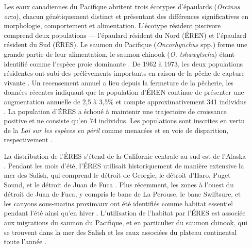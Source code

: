 Les eaux canadiennes du Pacifique abritent trois écotypes d'épaulards (\textit{Orcinus orca}), chacun génétiquement distinct et présentant des différences significatives en morphologie, comportement et alimentation. L'écotype résident piscivore comprend deux populations — l'épaulard résident du Nord (ÉREN) et l'épaulard résident du Sud (ÉRES). Le saumon du Pacifique (\textit{Oncorhynchus} spp.) forme une grande partie de leur alimentation, le saumon chinook (\textit{O. tshawytscha}) étant identifié comme l'espèce proie dominante \citep{fordSelectiveForagingFisheating2006, fordDietarySpecializationTwo1998, hansonSpeciesStockIdentification2010}. De 1962 à 1973, les deux populations résidentes ont subi des prélèvements importants en raison de la pêche de capture vivante \citep{biggLivecaptureKillerWhale1975}. Un recensement annuel a lieu depuis la fermeture de la pêcherie, les données récentes indiquant que la population d'ÉREN continue de présenter une augmentation annuelle de 2,5 à 3,5\% et compte approximativement 341 individus \citep{dfoPopulationStatusUpdate2023}. La population d'ÉRES a échoué à maintenir une trajectoire de croissance positive et ne consiste qu'en 74 individus. Les populations sont inscrites en vertu de la \textit{Loi sur les espèces en péril} comme menacées et en voie de disparition, respectivement \citep{cosewicCOSEWICAssessmentUpdate2001, cosewicCOSEWICAssessmentStatus2023}.

La distribution de l'ÉRES s'étend de la Californie centrale au sud-est de l'Alaska \citep{thorntonSouthernResidentKiller2022}. Pendant les mois d'été, l'ÉRES utilisait historiquement de manière extensive la mer des Salish, qui comprend le détroit de Georgie, le détroit d'Haro, Puget Sound, et le détroit de Juan de Fuca \citep{fordSelectiveForagingFisheating2006, fordHabitatsSpecialImportance2017}. Plus récemment, les zones à l'ouest du détroit de Juan de Fuca, y compris le banc de La Perouse, le banc Swiftsure, et les canyons sous-marins proximaux ont été identifiés comme habitat essentiel pendant l'été ainsi qu'en hiver \citep{fordHabitatsSpecialImportance2017, thorntonSouthernResidentKiller2022}. L'utilisation de l'habitat par l'ÉRES est associée aux migrations du saumon du Pacifique, et en particulier du saumon chinook, qui se trouvent dans la mer des Salish et les eaux associées du plateau continental toute l'année \citep{oneillMarineDistributionLife2009, chamberlinEffectsNatalOrigin2014, freshwaterIntegratedModelSeasonal2021}.

